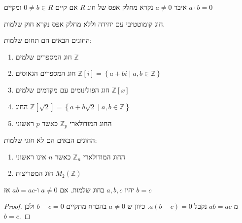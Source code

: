 \documentclass{tstextbook}
\begin{document}
\begin{definition}
איבר \(a\neq 0\) נקרא מחלק אפס של חוג \(R\) אם קיים \(0\neq b \in R\) ומקיים \(a\cdot b =0\)

\end{definition}
\begin{definition}
חוג קומוטטיבי עם יחידה וללא מחלק אפס נקרא חוק שלמות.

\end{definition}
\begin{example}
החוגים הבאים הם תחום שלמות:

  \begin{enumerate}
    \item חוג המספרים שלמים \(\mathbb{Z}\)


    \item חוג המספרים הגאוסים \(\mathbb{Z}[i]=\left\{ a+b i\mid a,b\in \mathbb{Z} \right\}\)


    \item חוג הפולינומים עם מקדמים שלמים \(\mathbb{Z}[x]\)


    \item החוג \(\mathbb{Z}\left[ {\sqrt{2}} \right]=\left\{ a+b{\sqrt{2}}\mid a,b\in \mathbb{Z} \right\}\)


    \item החוג המודולארי \(\mathbb{Z}_{p}\) כאשר \(p\) ראשוני 


  \end{enumerate}
\end{example}
\begin{example}
החוגים הבאים הם לא חוגי שלמות:

  \begin{enumerate}
    \item החוג המודולארי \(\mathbb{Z}_{n}\) כאשר \(n\) אינו ראשוני 


    \item חוג המטריצות \(M_{2}\left( \mathbb{Z} \right)\)


  \end{enumerate}
\end{example}
\begin{proposition}
יהיו \(a,b,c\) בחוג שלמות. אם \(a\neq 0\) ו-\(ab=ac\) אז \(b=c\)

\end{proposition}
\begin{proof}
מ-\(ab=ac\) נקבל \(a(b-c)=0\). כיוון ש-\(a\neq 0\) בהכרח מתקיים \(b-c=0\) ולכן \(b=c\).

\end{proof}
\end{document}
